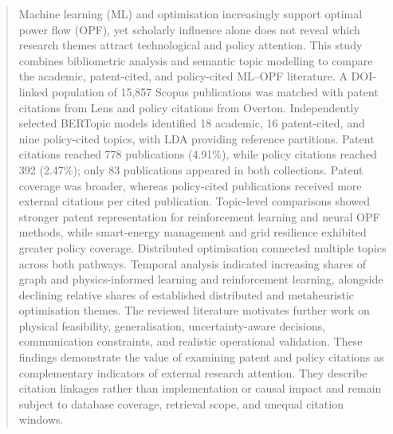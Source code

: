 \documentclass[a4paper,fleqn]{cas-sc}
\begin{document}
    
    
    
    
    \begin{abstract}
    Machine learning (ML) and optimisation increasingly support optimal power flow (OPF), yet scholarly influence alone does not reveal which research themes attract technological and policy attention. This study combines bibliometric analysis and semantic topic modelling to compare the academic, patent-cited, and policy-cited ML--OPF literature. A DOI-linked population of 15,857 Scopus publications was matched with patent citations from Lens and policy citations from Overton. Independently selected BERTopic models identified 18 academic, 16 patent-cited, and nine policy-cited topics, with LDA providing reference partitions. Patent citations reached 778 publications (4.91\%), while policy citations reached 392 (2.47\%); only 83 publications appeared in both collections. Patent coverage was broader, whereas policy-cited publications received more external citations per cited publication. Topic-level comparisons showed stronger patent representation for reinforcement learning and neural OPF methods, while smart-energy management and grid resilience exhibited greater policy coverage. Distributed optimisation connected multiple topics across both pathways. Temporal analysis indicated increasing shares of graph and physics-informed learning and reinforcement learning, alongside declining relative shares of established distributed and metaheuristic optimisation themes. The reviewed literature motivates further work on physical feasibility, generalisation, uncertainty-aware decisions, communication constraints, and realistic operational validation. These findings demonstrate the value of examining patent and policy citations as complementary indicators of external research attention. They describe citation linkages rather than implementation or causal impact and remain subject to database coverage, retrieval scope, and unequal citation windows.
    \end{abstract}
    
\end{document}
